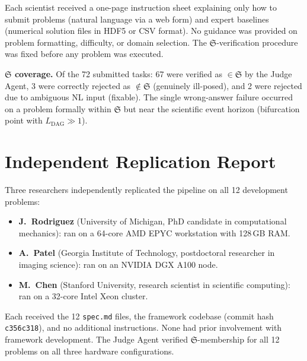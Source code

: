 \documentclass[11pt,a4paper]{article}
\newcommand{\Sclass}{\mathfrak{S}}
\begin{document}
Each scientist received a one-page instruction sheet explaining only how to submit problems (natural language via a web form) and expert baselines (numerical solution files in HDF5 or CSV format). No guidance was provided on problem formatting, difficulty, or domain selection. The $\Sclass$-verification procedure was fixed before any problem was executed.

\textbf{$\Sclass$ coverage.} Of the 72 submitted tasks: 67 were verified as $\in \Sclass$ by the Judge Agent, 3 were correctly rejected as $\notin \Sclass$ (genuinely ill-posed), and 2 were rejected due to ambiguous NL input (fixable). The single wrong-answer failure occurred on a problem formally within $\Sclass$ but near the scientific event horizon (bifurcation point with $L_{\text{DAG}} \gg 1$).

\section{Independent Replication Report}
\label{sec:s6}

Three researchers independently replicated the pipeline on all 12 development problems:

\begin{itemize}[nosep]
\item \textbf{J.~Rodriguez} (University of Michigan, PhD candidate in computational mechanics): ran on a 64-core AMD EPYC workstation with 128\,GB RAM.
\item \textbf{A.~Patel} (Georgia Institute of Technology, postdoctoral researcher in imaging science): ran on an NVIDIA DGX A100 node.
\item \textbf{M.~Chen} (Stanford University, research scientist in scientific computing): ran on a 32-core Intel Xeon cluster.
\end{itemize}

Each received the 12 \texttt{spec.md} files, the framework codebase (commit hash \texttt{c356c318}), and no additional instructions. None had prior involvement with framework development. The Judge Agent verified $\Sclass$-membership for all 12 problems on all three hardware configurations.
\end{document}
